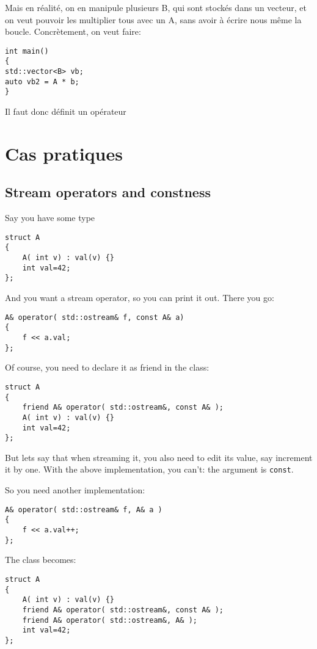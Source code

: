 \documentclass[11pt,a4paper]{article}
\begin{document}
\begin{lstlisting}
\end{lstlisting}


Mais en réalité, on en manipule plusieurs B, qui sont stockés dans un vecteur, et on veut pouvoir les multiplier tous avec un A, sans avoir à écrire nous même la boucle.
Concrètement, on veut faire:
\begin{lstlisting}
int main()
{
std::vector<B> vb;
auto vb2 = A * b;
}
\end{lstlisting}

Il faut donc définit un opérateur

\section{Cas pratiques}

\subsection{Stream operators and constness}

Say you have some type
\begin{lstlisting}
struct A
{
	A( int v) : val(v) {}
	int val=42;
};
\end{lstlisting}

And you want a stream operator, so you can print it out.
There you go:

\begin{lstlisting}
A& operator( std::ostream& f, const A& a)
{
	f << a.val;
};
\end{lstlisting}

Of course, you need to declare it as friend in the class:
\begin{lstlisting}
struct A
{
	friend A& operator( std::ostream&, const A& );
	A( int v) : val(v) {}
	int val=42;
};
\end{lstlisting}

But lets say that when streaming it, you also need to edit its value, say increment it by one.
With the above implementation, you can't: the argument is {\tt const}.

So you need another implementation:
\begin{lstlisting}
A& operator( std::ostream& f, A& a )
{
	f << a.val++;
};
\end{lstlisting}

The class becomes:
\begin{lstlisting}
struct A
{
	A( int v) : val(v) {}
	friend A& operator( std::ostream&, const A& );
	friend A& operator( std::ostream&, A& );
	int val=42;
};
\end{lstlisting}
\end{document}
